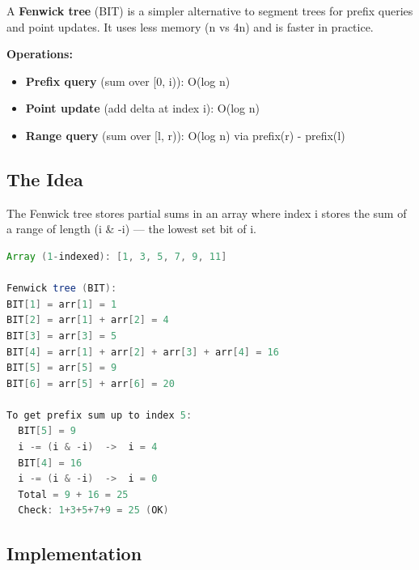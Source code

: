 A \textbf{Fenwick tree} (BIT) is a simpler alternative to segment trees for prefix queries and point updates. It uses less memory (n vs 4n) and is faster in practice.

\textbf{Operations:}
\begin{itemize}
\item \textbf{Prefix query} (sum over [0, i)): O(log n)
\item \textbf{Point update} (add delta at index i): O(log n)
\item \textbf{Range query} (sum over [l, r)): O(log n) via prefix(r) - prefix(l)
\end{itemize}

\subsection{The Idea}

The Fenwick tree stores partial sums in an array where index i stores the sum of a range of length (i \& -i) — the lowest set bit of i.

\begin{lstlisting}[language=Java]
Array (1-indexed): [1, 3, 5, 7, 9, 11]

Fenwick tree (BIT):
BIT[1] = arr[1] = 1
BIT[2] = arr[1] + arr[2] = 4
BIT[3] = arr[3] = 5
BIT[4] = arr[1] + arr[2] + arr[3] + arr[4] = 16
BIT[5] = arr[5] = 9
BIT[6] = arr[5] + arr[6] = 20

To get prefix sum up to index 5:
  BIT[5] = 9
  i -= (i & -i)  ->  i = 4
  BIT[4] = 16
  i -= (i & -i)  ->  i = 0
  Total = 9 + 16 = 25
  Check: 1+3+5+7+9 = 25 (OK)
\end{lstlisting}

\subsection{Implementation}

